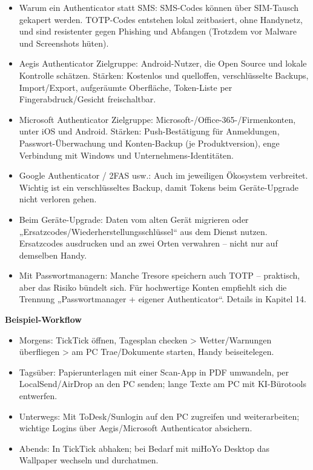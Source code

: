 \begin{itemize}
  \item Warum ein Authenticator statt SMS: SMS-Codes können über SIM-Tausch gekapert werden. TOTP-Codes entstehen lokal zeitbasiert, ohne Handynetz, und sind resistenter gegen Phishing und Abfangen (Trotzdem vor Malware und Screenshots hüten).
  \item Aegis Authenticator Zielgruppe: Android-Nutzer, die Open Source und lokale Kontrolle schätzen. Stärken: Kostenlos und quelloffen, verschlüsselte Backups, Import/Export, aufgeräumte Oberfläche, Token-Liste per Fingerabdruck/Gesicht freischaltbar.
  \item Microsoft Authenticator Zielgruppe: Microsoft-/Office-365-/Firmenkonten, unter iOS und Android. Stärken: Push-Bestätigung für Anmeldungen, Passwort-Überwachung und Konten-Backup (je Produktversion), enge Verbindung mit Windows und Unternehmens-Identitäten.
  \item Google Authenticator / 2FAS usw.: Auch im jeweiligen Ökosystem verbreitet. Wichtig ist ein verschlüsseltes Backup, damit Tokens beim Geräte-Upgrade nicht verloren gehen.
  \item Beim Geräte-Upgrade: Daten vom alten Gerät migrieren oder „Ersatzcodes/Wiederherstellungsschlüssel“ aus dem Dienst nutzen. Ersatzcodes ausdrucken und an zwei Orten verwahren – nicht nur auf demselben Handy.
  \item Mit Passwortmanagern: Manche Tresore speichern auch TOTP – praktisch, aber das Risiko bündelt sich. Für hochwertige Konten empfiehlt sich die Trennung „Passwortmanager + eigener Authenticator“. Details in Kapitel 14.
\end{itemize}


\textbf{Beispiel-Workflow}\par

\begin{itemize}
  \item Morgens: TickTick öffnen, Tagesplan checken > Wetter/Warnungen überfliegen > am PC Trae/Dokumente starten, Handy beiseitelegen.
  \item Tagsüber: Papierunterlagen mit einer Scan-App in PDF umwandeln, per LocalSend/AirDrop an den PC senden; lange Texte am PC mit KI-Bürotools entwerfen.
  \item Unterwegs: Mit ToDesk/Sunlogin auf den PC zugreifen und weiterarbeiten; wichtige Logins über Aegis/Microsoft Authenticator absichern.
  \item Abends: In TickTick abhaken; bei Bedarf mit miHoYo Desktop das Wallpaper wechseln und durchatmen.
\end{itemize}

